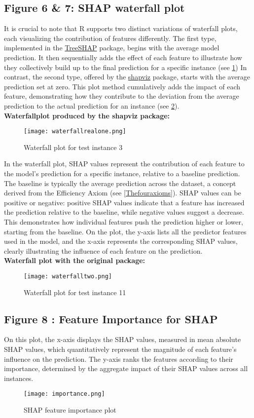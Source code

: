 \documentclass[12pt]{article}
\begin{document}
\subsection{Figure 6 \& 7: SHAP waterfall plot}
It is crucial to note that R supports two distinct variations of waterfall plots, each visualizing the contribution of features differently. The first type, implemented in the \href{https://github.com/ModelOriented/treeshap}{TreeSHAP} package, begins with the average model prediction. It then sequentially adds the effect of each feature to illustrate how they collectively build up to the final prediction for a specific instance  (see \ref{fig:origwaterfall})
In contrast, the second type, offered by the  \href{https://github.com/ModelOriented/shapviz}{shapviz} package, starts with the average prediction set at zero. This plot method cumulatively adds the impact of each feature, demonstrating how they contribute to the deviation from the average prediction to the actual prediction for an instance (see \ref{fig:waterfall}).\\
\textbf{Waterfallplot produced by the shapviz package:}
\begin{figure}[H]
	\centering
	\texttt{[image: waterfallrealone.png]}
	\caption{Waterfall plot for test instance 3}
	\label{fig:origwaterfall}
\end{figure}
In the waterfall plot, SHAP values represent the contribution of each feature to the model's prediction for a specific instance, relative to a baseline prediction. The baseline is typically the average prediction across the dataset, a concept derived from the Efficiency Axiom (see \ref{Thefouraxioms}). SHAP values can be positive or negative: positive SHAP values indicate that a feature has increased the prediction relative to the baseline, while negative values suggest a decrease. This demonstrates how individual features push the prediction higher or lower, starting from the baseline. On the plot, the y-axis lists all the predictor features used in the model, and the x-axis represents the corresponding SHAP values, clearly illustrating the influence of each feature on the prediction.\\
\textbf{Waterfall plot with the original package:}
\begin{figure}[H]
	\centering
	\texttt{[image: waterfalltwo.png]}
	\caption{Waterfall plot for test instance 11}
	\label{fig:waterfall}
\end{figure}

\newpage
\subsection{Figure 8 : Feature Importance for SHAP}
On this plot, the x-axis displays the SHAP values, measured in mean absolute SHAP values, which quantitatively represent the magnitude of each feature's influence on the prediction. The y-axis ranks the features according to their importance, determined by the aggregate impact of their SHAP values across all instances.
\begin{figure}[H]
	\centering
	\texttt{[image: importance.png]}
	\caption{SHAP feature importance plot}
	\label{fig:shapimp}
\end{figure}
\end{document}
